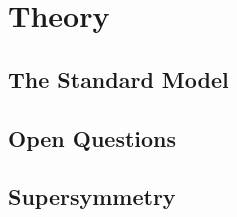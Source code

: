\chapter{Theory}
\label{chap:theory}

\section{The Standard Model}
\section{Open Questions}
\section{Supersymmetry}
